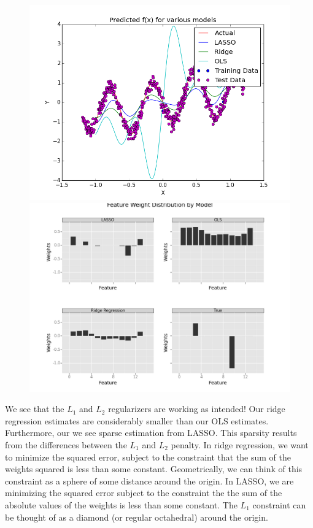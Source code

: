 \documentclass[10pt]{article}
\begin{document}
\begin{figure}[ht]
	\centering
	\begin{minipage}[b]{.48\linewidth}
                \includegraphics[width=1\linewidth]{plot4}
	\end{minipage}
	\begin{minipage}[b]{.48\linewidth}
                \includegraphics[width=1\linewidth]{Weight_Distributions.png}
	\end{minipage}
\end{figure}

We see that the $L_1$ and $L_2$ regularizers are working as intended! Our ridge regression estimates are considerably smaller than our OLS estimates. Furthermore, our we see sparse estimation from LASSO. This sparsity results from the differences between the $L_1$ and $L_2$ penalty. In ridge regression, we want to minimize the squared error, subject to the constraint that the sum of the weights squared is less than some constant. Geometrically, we can think of this constraint as a sphere of some distance around the origin. In LASSO, we are minimizing the squared error subject to the constraint the the sum of the absolute values of the weights is less than some constant. The $L_1$ constraint can be thought of as a diamond (or regular octahedral) around the origin.
\end{document}
